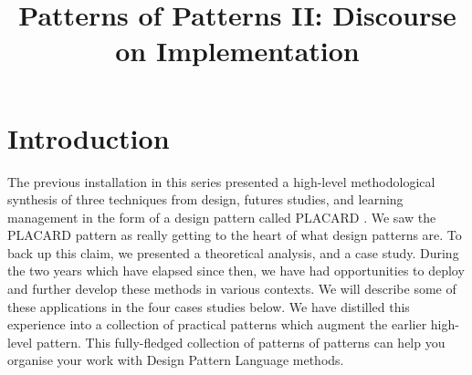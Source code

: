 \documentclass[acmlarge,timestamp]{acmart}
\date{}
\title{Patterns of Patterns II: Discourse on Implementation}
\begin{document}



\section{Introduction}
\label{sec:org195e8e3}
\label{Introduction}


The previous installation in this series presented a high-level
methodological synthesis of three techniques from design, futures
studies, and learning management
in the form of a design pattern
called PLACARD \cite{patterns-of-patterns-i}.  We saw the PLACARD pattern as really getting to the heart of what design patterns are.
To back up this claim, we presented a theoretical analysis, and a case
study.  During the two years which have elapsed since then, we have
had opportunities to deploy and further develop these methods in
various contexts.  We will describe some of these applications in the
four cases studies below.  We have distilled this experience into a
collection of practical patterns which augment the earlier high-level
pattern.  This fully-fledged collection of patterns of patterns can
help you organise your work with Design Pattern Language methods.


\end{document}
